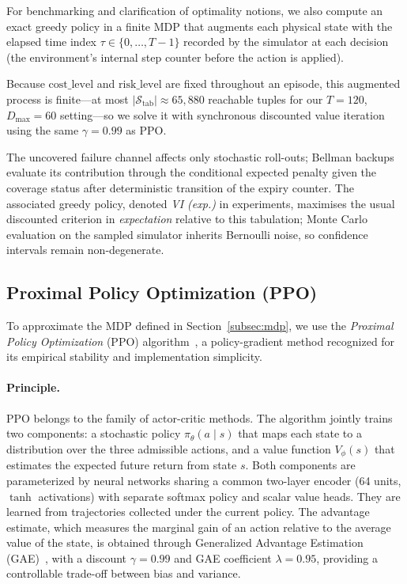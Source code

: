 For benchmarking and clarification of optimality notions, we also compute an
exact greedy policy in a finite MDP that augments each physical state with the
elapsed time index $\tau \in \{0,\dots,T{-}1\}$ recorded by the simulator at
each decision (the environment's internal step counter before the action is
applied).

Because $\mathrm{cost\_level}$ and $\mathrm{risk\_level}$ are fixed throughout
an episode, this augmented process is finite---at most
$|\mathcal{S}_\text{tab}| \approx 65{,}880$ reachable tuples for our
$T{=}120$, $D_{\max}{=}60$ setting---so we solve it with synchronous
discounted value iteration using the same $\gamma{=}0{.}99$ as PPO.

The uncovered failure channel affects only stochastic roll-outs; Bellman backups
evaluate its contribution through the conditional expected penalty given the
coverage status after deterministic transition of the expiry counter. The
associated greedy policy, denoted \emph{VI (exp.)} in experiments, maximises the
usual discounted criterion in \emph{expectation} relative to this tabulation;
Monte Carlo evaluation on the sampled simulator inherits Bernoulli noise, so confidence
intervals remain non-degenerate.


\subsection{Proximal Policy Optimization (PPO)}
\label{subsec:ppo}

To approximate the MDP defined in Section~\ref{subsec:mdp}, we use the
\emph{Proximal Policy Optimization} (PPO)
algorithm~\cite{schulman2017ppo}, a policy-gradient method recognized for
its empirical stability and implementation simplicity.


\paragraph{Principle.}
PPO belongs to the family of actor-critic methods. The algorithm jointly
trains two components: a stochastic policy $\pi_\theta(a \mid s)$ that
maps each state to a distribution over the three admissible actions, and
a value function $V_\phi(s)$ that estimates the expected future return
from state $s$. Both components are parameterized by neural networks
sharing a common two-layer encoder (64 units, $\tanh$ activations) with
separate softmax policy and scalar value heads. They are learned from
trajectories collected under the current policy. The advantage estimate,
which measures the marginal gain of an action relative to the average
value of the state, is obtained through Generalized Advantage Estimation
(GAE)~\cite{schulman2016gae}, with a discount $\gamma = 0.99$ and GAE
coefficient $\lambda = 0.95$, providing a controllable trade-off between
bias and variance.


